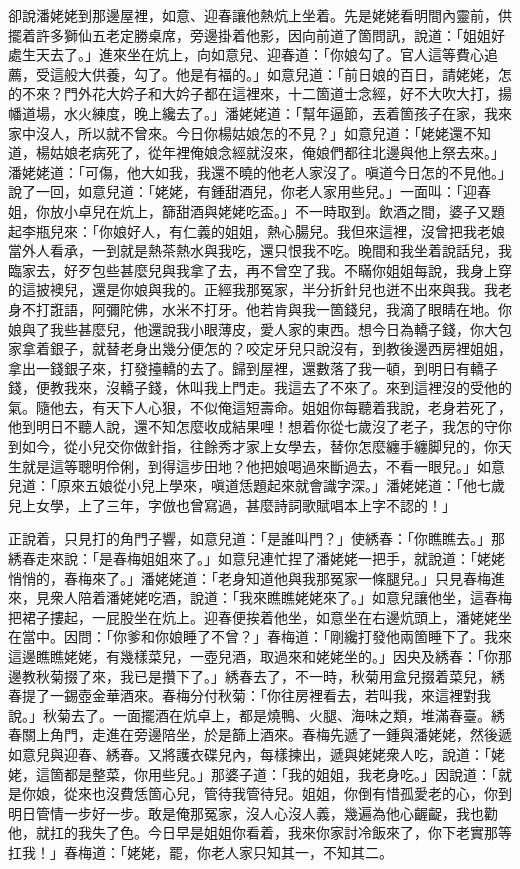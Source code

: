 卻說潘姥姥到那邊屋裡，如意、迎春讓他熱炕上坐着。先是姥姥看明間內靈前，供擺着許多獅仙五老定勝桌席，旁邊掛着他影，因向前道了箇問訊，說道：「姐姐好處生天去了。」進來坐在炕上，向如意兒、迎春道：「你娘勾了。官人這等費心追薦，受這般大供養，勾了。他是有福的。」{}如意兒道：「前日娘的百日，請姥姥，怎的不來？門外花大妗子和大妗子都在這裡來，十二箇道士念經，好不大吹大打，揚幡道場，水火練度，晚上纔去了。」潘姥姥道：「幫年逼節，丟着箇孩子在家，我來家中沒人，所以就不曾來。今日你楊姑娘怎的不見？」如意兒道：「姥姥還不知道，楊姑娘老病死了，從年裡俺娘念經就沒來，俺娘們都往北邊與他上祭去來。」潘姥姥道：「可傷，他大如我，我還不曉的他老人家沒了。嗔道今日怎的不見他。」說了一回，如意兒道：「姥姥，有鍾甜酒兒，你老人家用些兒。」一面叫：「迎春姐，你放小卓兒在炕上，篩甜酒與姥姥吃盃。」不一時取到。飲酒之間，婆子又題起李瓶兒來：「你娘好人，有仁義的姐姐，熱心腸兒。{}我但來這裡，沒曾把我老娘當外人看承，一到就是熱茶熱水與我吃，還只恨我不吃。晚間和我坐着說話兒，我臨家去，好歹包些甚麼兒與我拿了去，再不曾空了我。不瞞你姐姐每說，我身上穿的這披襖兒，還是你娘與我的。{}正經我那冤家，半分折針兒也迸不出來與我。我老身不打誑語，阿彌陀佛，{}水米不打牙。他若肯與我一箇錢兒，我滴了眼睛在地。你娘與了我些甚麼兒，他還說我小眼薄皮，愛人家的東西。想今日為轎子錢，你大包家拿着銀子，就替老身出幾分便怎的？咬定牙兒只說沒有，到教後邊西房裡姐姐，拿出一錢銀子來，打發擡轎的去了。歸到屋裡，還數落了我一頓，到明日有轎子錢，便教我來，沒轎子錢，休叫我上門走。我這去了不來了。{}來到這裡沒的受他的氣。隨他去，有天下人心狠，不似俺這短壽命。姐姐你每聽着我說，老身若死了，他到明日不聽人說，還不知怎麼收成結果哩！{}想着你從七歲沒了老子，我怎的守你到如今，從小兒交你做針指，往餘秀才家上女學去，替你怎麼纏手纏脚兒的，你天生就是這等聰明伶俐，到得這步田地？他把娘喝過來斷過去，不看一眼兒。」如意兒道：「原來五娘從小兒上學來，嗔道恁題起來就會識字深。」潘姥姥道：「他七歲兒上女學，上了三年，字倣也曾寫過，甚麼詩詞歌賦唱本上字不認的！」

正說着，只見打的角門子響，如意兒道：「是誰叫門？」使綉春：「你瞧瞧去。」那綉春走來說：「是春梅姐姐來了。」如意兒連忙捏了潘姥姥一把手，{}就說道：「姥姥悄悄的，春梅來了。」潘姥姥道：「老身知道他與我那冤家一條腿兒。」只見春梅進來，見衆人陪着潘姥姥吃酒，說道：「我來瞧瞧姥姥來了。」如意兒讓他坐，這春梅把裙子摟起，一屁股坐在炕上。迎春便挨着他坐，如意坐在右邊炕頭上，潘姥姥坐在當中。因問：「你爹和你娘睡了不曾？」春梅道：「剛纔打發他兩箇睡下了。我來這邊瞧瞧姥姥，有幾樣菜兒，一壺兒酒，取過來和姥姥坐的。」因央及綉春：「你那邊教秋菊掇了來，我已是攢下了。」綉春去了，不一時，秋菊用盒兒掇着菜兒，綉春提了一錫壺金華酒來。春梅分付秋菊：「你往房裡看去，若叫我，來這裡對我說。」秋菊去了。一面擺酒在炕卓上，都是燒鴨、火腿、海味之類，堆滿春臺。綉春關上角門，走進在旁邊陪坐，於是篩上酒來。春梅先遞了一鍾與潘姥姥，然後遞如意兒與迎春、綉春。又將護衣碟兒內，每樣揀出，遞與姥姥衆人吃，說道：「姥姥，這箇都是整菜，你用些兒。」那婆子道：「我的姐姐，我老身吃。」因說道：「就是你娘，從來也沒費恁箇心兒，管待我管待兒。姐姐，你倒有惜孤愛老的心，你到明日管情一步好一步。敢是俺那冤家，沒人心沒人義，幾遍為他心齷齪，我也勸他，就扛的我失了色。今日早是姐姐你看着，我來你家討冷飯來了，你下老實那等扛我！」春梅道：「姥姥，罷，你老人家只知其一，不知其二。

